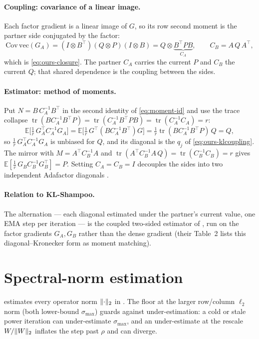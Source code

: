 \documentclass[11pt]{article}
\newcommand{\E}{\mathbb{E}}
\newcommand{\smax}{\sigma_{\max}}
\DeclarePairedDelimiter{\norm}{\lVert}{\rVert}
\theoremstyle{plain}
\theoremstyle{definition}
\theoremstyle{remark}
\begin{document}
\paragraph{Coupling: covariance of a linear image.} Each factor gradient is a linear
image of $G$, so its row second moment is the partner side conjugated by the factor:
\begin{equation*}
  \mathrm{Cov}\,\mathrm{vec}(G_A)=(I\otimes B^\top)(Q\otimes P)(I\otimes B)
  =Q\otimes\underbrace{B^\top P B}_{C_A},\qquad C_B=A\,Q\,A^\top,
\end{equation*}
which is \eqref{eq:ours-closure}. The partner $C_A$ carries the current $P$ and $C_B$ the
current $Q$; that shared dependence is the coupling between the sides.

\paragraph{Estimator: method of moments.} Put $N=B\,C_A^{-1}B^\top$ in the second
identity of \eqref{eq:moment-id} and use the trace collapse
$\operatorname{tr}(B C_A^{-1}B^\top P)=\operatorname{tr}(C_A^{-1}B^\top P B)=\operatorname{tr}(C_A^{-1}C_A)=r$:
\begin{equation*}
  \E\!\big[\tfrac1r\,G_A^\top C_A^{-1}G_A\big]
  =\E\!\big[\tfrac1r\,G^\top(B C_A^{-1}B^\top)G\big]
  =\tfrac1r\operatorname{tr}(B C_A^{-1}B^\top P)\,Q=Q,
\end{equation*}
so $\tfrac1r\,G_A^\top C_A^{-1}G_A$ is unbiased for $Q$, and its diagonal is the $q_j$ of
\eqref{eq:ours-klcoupling}. The mirror with $M=A^\top C_B^{-1}A$ and
$\operatorname{tr}(A^\top C_B^{-1}A\,Q)=\operatorname{tr}(C_B^{-1}C_B)=r$ gives
$\E[\tfrac1r\,G_B C_B^{-1}G_B^\top]=P$. Setting $C_A=C_B=I$ decouples the sides into two
independent Adafactor diagonals \cite{adafactor}.

\paragraph{Relation to KL-Shampoo.} The alternation --- each diagonal estimated under the
partner's current value, one EMA step per iteration --- is the coupled two-sided
estimator of \cite{klshampoo}, run on the factor gradients $G_A,G_B$ rather than the
dense gradient (their Table~2 lists this diagonal--Kronecker form as moment matching).

\section{Spectral-norm estimation}
\label{app:smax}
 estimates every operator norm $\norm{\cdot}_2$ in . The floor at the larger row/column $\ell_2$ norm (both lower-bound $\smax$) guards against under-estimation: a cold or stale power iteration can under-estimate $\smax$, and an under-estimate at the rescale $W/\norm{W}_2$ inflates the step past $\rho$ and can diverge.
\end{document}
